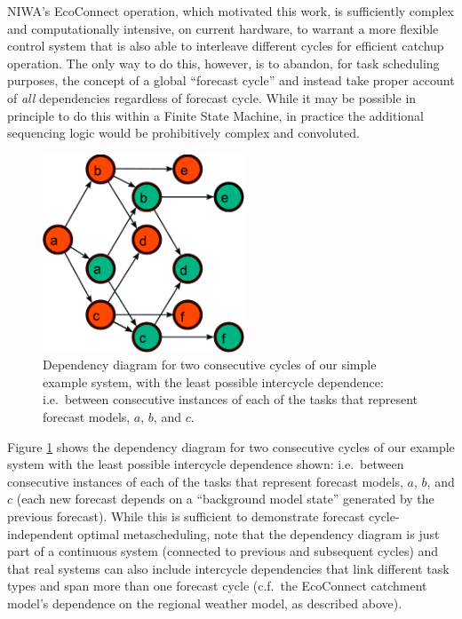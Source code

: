 \documentclass[11pt,a4paper]{article}
\begin{document}
NIWA's EcoConnect operation, which motivated this work, is sufficiently
complex and computationally intensive, on current hardware, to warrant a
more flexible control system that is also able to interleave different
cycles for efficient catchup operation.  The only way to do this,
however, is to abandon, for task scheduling purposes, the concept of a
global ``forecast cycle'' and instead take proper account of {\em all}
dependencies regardless of forecast cycle.  While it may be possible in
principle to do this within a Finite State Machine, in practice the
additional sequencing logic would be prohibitively complex and convoluted. 
\begin{figure} \begin{center}
    \includegraphics[width=6cm]{dependencies-two} \end{center}
    \caption{\small Dependency diagram for two consecutive cycles of our
    simple example system, with the least possible intercycle
    dependence: i.e.\ between consecutive instances of each of the
    tasks that represent forecast models, $a$, $b$, and $c$.} 
    \label{fig-dep-two}
\end{figure}
Figure \ref{fig-dep-two} shows the dependency diagram for two
consecutive cycles of our example system with the least possible
intercycle dependence shown: i.e.\ between consecutive instances of each
of the tasks that represent forecast models, $a$, $b$, and $c$ (each new
forecast depends on a ``background model state'' generated by the
previous forecast). While this is sufficient to demonstrate forecast
cycle-independent optimal metascheduling, note that the dependency
diagram is just part of a continuous system (connected to previous and
subsequent cycles) and that real systems can also include intercycle
dependencies that link different task types and span more than one
forecast cycle (c.f.\ the EcoConnect catchment model's dependence on the
regional weather model, as described above). 
\end{document}
